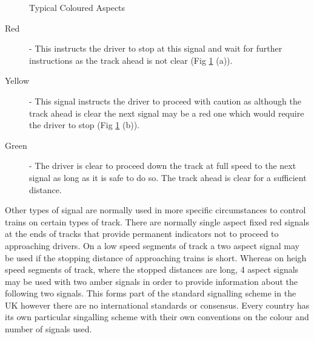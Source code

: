 \begin{figure}[h!]
\begin{center}
 \quad
{} \quad
{}

\end{center}
\caption{Typical Coloured Aspects}
\label{fig:aspects}
\end{figure}


\begin{description}

\item[Red] -  This instructs the driver to stop at this signal and wait for further instructions as the track ahead is not clear  (Fig \ref{fig:aspects} (a)). 


\item[Yellow] - This signal instructs the driver to proceed with caution as although the track ahead is clear the next signal may be a red one which would require the driver to stop (Fig \ref{fig:aspects} (b)).

\item[Green] -  The driver is clear to proceed down the track at full speed to the next signal as long as it is safe to do so. The track ahead is clear for a sufficient distance.
\end{description}

Other types of signal are normally used in more specific circumstances to control trains on certain types of track.  There are normally single aspect fixed red signals at the ends of tracks that provide permanent indicators not to proceed to approaching drivers. On a low speed segments of track a two aspect signal may be used if the stopping distance of approaching trains is short. Whereas on heigh speed segments of track, where the stopped distances are long, 4 aspect signals may be used with two amber signals in order to provide information about the following two signals. This forms part of the standard signalling scheme in the UK however there are no international standards or consensus. Every country has its own particular singalling scheme with their own conventions on the colour and number of signals used. 


